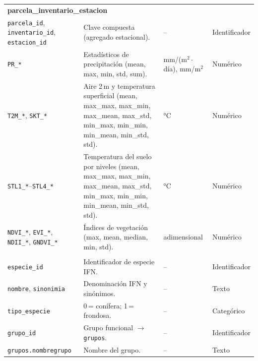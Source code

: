 \begin{longtable}{p{3.2cm} p{7.6cm} p{2.4cm} p{2.4cm}}
\multicolumn{4}{l}{\textbf{parcela\_inventario\_estacion}} \\
\texttt{parcela\_id}, \texttt{inventario\_id}, \texttt{estacion\_id} & Clave compuesta (agregado estacional). & -- & Identificador \\
\texttt{PR\_*} & Estadísticos de precipitación (mean, max, min, std, sum). & mm/(m$^2\cdot$día), mm/m$^2$ & Numérico \\
\texttt{T2M\_*}, \texttt{SKT\_*} & Aire 2\,m y temperatura superficial (mean, max\_max, max\_min, max\_mean, max\_std, min\_max, min\_min, min\_mean, min\_std, std). & °C & Numérico \\
\texttt{STL1\_*}--\texttt{STL4\_*} & Temperatura del suelo por niveles (mean, max\_max, max\_min, max\_mean, max\_std, min\_max, min\_min, min\_mean, min\_std, std). & °C & Numérico \\
\texttt{NDVI\_*}, \texttt{EVI\_*}, \texttt{NDII\_*}, \texttt{GNDVI\_*} & Índices de vegetación (max, mean, median, min, std). & adimensional & Numérico \\
\addlinespace

\multicolumn{4}{l}{\textbf{especies} y \textbf{grupos}} \\
\texttt{especie\_id} & Identificador de especie IFN. & -- & Identificador \\
\texttt{nombre}, \texttt{sinonimia} & Denominación IFN y sinónimos. & -- & Texto \\
\texttt{tipo\_especie} & 0\,= conífera; 1\,= frondosa. & -- & Categórico \\
\texttt{grupo\_id} & Grupo funcional $\rightarrow$ \texttt{grupos}. & -- & Identificador \\
\texttt{grupos.nombregrupo} & Nombre del grupo. & -- & Texto \\
\end{longtable}
\normalsize
